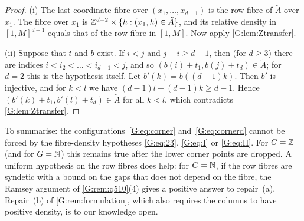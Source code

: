 \begin{proof}
(i) The last-coordinate fibre over $(x_1,\dots,x_{d-1})$ is the row fibre of $\tilde A$ over
$x_1$. The fibre over $x_1$ is $\mathbb{Z}^{d-2}\times\{h:(x_1,h)\in \tilde A\}$, and its relative
density in $[1,M]^{d-1}$ equals that of the row fibre in $[1,M]$. Now apply
\cref{G:lem:Ztransfer}.

(ii) Suppose that $t$ and $b$ exist. If $i<j$ and $j-i\ge d-1$, then (for $d\ge3$) there are
indices $i<i_2<\dots<i_{d-1}<j$, and so $(b(i)+t_1,b(j)+t_d)\in \tilde A$; for $d=2$ this is
the hypothesis itself. Let
$b'(k)=b((d-1)k)$. Then $b'$ is injective, and for $k<l$ we have
$(d-1)l-(d-1)k\ge d-1$. Hence $(b'(k)+t_1,b'(l)+t_d)\in \tilde A$ for all $k<l$, which
contradicts \cref{G:lem:Ztransfer}.
\end{proof}

To summarise: the configurations~\eqref{G:eq:corner} and~\eqref{G:eq:cornerd} cannot be
forced by the fibre-density hypotheses \eqref{G:eq:23}, \eqref{G:eq:I} or \eqref{G:eq:II}.
For $G=\mathbb{Z}$ (and for $G=\mathbb{N}$) this remains true after the lower corner points are dropped.
A uniform hypothesis on the row fibres does help: for $G=\mathbb{N}$, if the row fibres are syndetic with
a bound on the gaps that does not depend on the fibre, the Ramsey argument of
\cref{G:rem:q510}(4) gives a positive answer to repair~(a). Repair~(b) of
\cref{G:rem:formulation}, which also requires the columns to have positive density, is to our
knowledge open.
